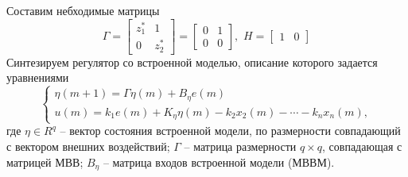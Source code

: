 Составим небходимые матрицы
\begin{equation}
	\Gamma = \begin{bmatrix}
		z_1^* & 1\\
		0 & z_2^*
	\end{bmatrix} = \begin{bmatrix}
	0 & 1\\
	0 & 0
	\end{bmatrix}, \, \, 
	H = \begin{bmatrix}
		1 & 0
	\end{bmatrix}
\end{equation}
Синтезируем регулятор со встроенной моделью, описание которого задается уравнениями
\begin{equation}
	\begin{cases}
		\eta (m+1) = \Gamma \eta (m) + B_\eta e(m)\\
		u(m) = k_1e(m) + K_\eta \eta (m) - k_2x_2(m) - \cdots - k_n x_n(m),
	\end{cases}
\end{equation}
где $\eta \in R^q$ -- вектор состояния встроенной модели, по размерности совпадающий с вектором внешних воздействий; $\Gamma$ -- матрица размерности $q \times q$, совпадающая с матрицей МВВ; $B_\eta$ -- матрица входов встроенной модели (МВВМ).

